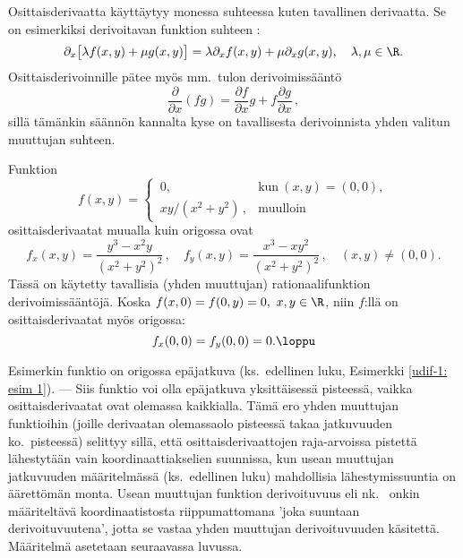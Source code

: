 Osittaisderivaatta käyttäytyy monessa suhteessa kuten tavallinen derivaatta. Se on esimerkiksi
derivoitavan funktion suhteen :
%
\[
\partial_x\bigl[\lambda f(x,y)+\mu g(x,y)\bigr]
              =\lambda\partial_x f(x,y)+\mu\partial_x g(x,y),\quad \lambda,\mu\in\R.
\]
Osittaisderivoinnille pätee myös mm.\ tulon derivoimissääntö
\[
\frac{\partial}{\partial x} (fg)
              =\frac{\partial f}{\partial x} g + f\frac{\partial g}{\partial x}\,,
\]
sillä tämänkin säännön kannalta kyse on tavallisesta derivoinnista yhden valitun muuttujan 
suhteen.
\begin{Exa} \label{osder-esim 1} Funktion
\[
f(x,y) = \begin{cases} 
          \,0, &\text{kun}\ (x,y)=(0,0), \\ \,xy/(x^2+y^2)\,, &\text{muulloin}
         \end{cases}
\]
osittaisderivaatat muualla kuin origossa ovat
\[
f_x(x,y) = \frac{y^3-x^2y}{(x^2+y^2)^2}\,, \quad
f_y(x,y) = \frac{x^3-xy^2}{(x^2+y^2)^2}\,, \quad (x,y)\neq(0,0).
\]
Tässä on käytetty tavallisia (yhden muuttujan) rationaalifunktion derivoimissääntöjä. Koska
$f(x,0)=f(0,y)=0,\ x,y\in\R$, niin $f$:llä on osittaisderivaatat myös origossa:
\[
f_x(0,0)=f_y(0,0)=0. \loppu
\]
\end{Exa}
Esimerkin funktio on origossa epäjatkuva (ks.\ edellinen luku, Esimerkki \ref{udif-1: esim 1}).
--- Siis funktio voi olla epäjatkuva yksittäisessä pisteessä, vaikka
osittaisderivaatat ovat olemassa kaikkialla. Tämä ero yhden muuttujan funktioihin (joille
derivaatan olemassaolo pisteessä takaa jatkuvuuden ko.\ pisteessä) selittyy
sillä, että osittaisderivaattojen raja-arvoissa pistettä lähestytään vain koordinaattiakselien
suunnissa, kun usean muuttujan jatkuvuuden määritelmässä (ks.\ edellinen luku) mahdollisia
lähestymissuuntia on äärettömän monta. Usean muuttujan funktion derivoituvuus eli nk.\
 onkin määriteltävä koordinaatistosta riippumattomana
'joka suuntaan derivoituvuutena', jotta se vastaa yhden muuttujan derivoituvuuden käsitettä.
Määritelmä asetetaan seuraavassa luvussa.

